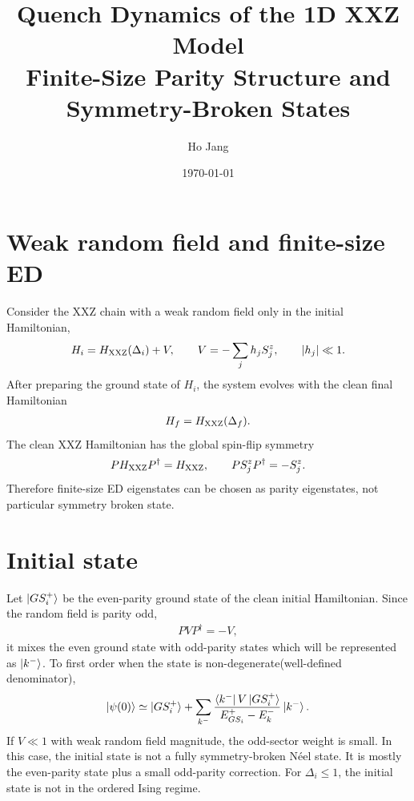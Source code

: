 \documentclass[11pt]{article}
\title{\textbf{Quench Dynamics of the 1D XXZ Model}\\
\large Finite-Size Parity Structure and Symmetry-Broken States}
\author{Ho Jang}
\date{\today}
\begin{document}
\maketitle

\section{Weak random field and finite-size ED}

Consider the XXZ chain with a weak random field only in the initial Hamiltonian,
\begin{align}
    H_i = H_{\rm XXZ}(\Delta_i) + V,
    \qquad
    V=-\sum_j h_j S_j^z ,
    \qquad
    |h_j|\ll 1 .
\end{align}
After preparing the ground state of $H_i$, the system evolves with the clean final
Hamiltonian
\begin{align}
    H_f = H_{\rm XXZ}(\Delta_f).
\end{align}
The clean XXZ Hamiltonian has the global spin-flip symmetry
\begin{align}
    P H_{\rm XXZ} P^\dagger = H_{\rm XXZ},
    \qquad
    P S_j^z P^\dagger = -S_j^z .
\end{align}
Therefore finite-size ED eigenstates can be chosen as parity eigenstates, not particular symmetry broken state.

\section{Initial state}

Let $\ket{GS_i^+}$ be the even-parity ground state of the clean initial Hamiltonian.
Since the random field is parity odd,
\begin{align}
    P V P^\dagger = -V ,
\end{align}
it mixes the even ground state with odd-parity states which will be represented as $\ket{k^-}$. To first order when the state is non-degenerate(well-defined denominator), 
\begin{align}
    \ket{\psi(0)}
    \simeq
    \ket{GS_i^+}
    +
    \sum_{k^-}
    \frac{\bra{k^-}V\ket{GS_i^+}}
    {E_{GS_i}^+-E_k^-}
    \ket{k^-}.
    \label{eq:initial_state}
\end{align}
If $V \ll 1$ with weak random field magnitude, the odd-sector weight is small. In this case, the initial state is not a fully symmetry-broken N\'eel state. It is mostly
the even-parity state plus a small odd-parity correction. For $\Delta_i\leq 1$, the initial state is not in the ordered Ising regime.
\end{document}

